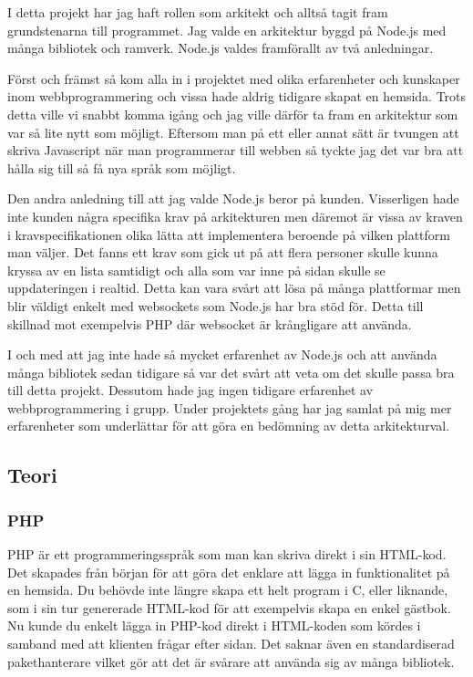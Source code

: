I detta projekt har jag haft rollen som arkitekt och alltså tagit fram grundstenarna till programmet. Jag valde en arkitektur byggd på Node.js med många bibliotek och ramverk. Node.js valdes framförallt av två anledningar. 

Först och främst så kom alla in i projektet med olika erfarenheter och kunskaper inom webbprogrammering och vissa hade aldrig tidigare skapat en hemsida. Trots detta ville vi snabbt komma igång och jag ville därför ta fram en arkitektur som var så lite nytt som möjligt. Eftersom man på ett eller annat sätt är tvungen att skriva Javascript när man programmerar till webben så tyckte jag det var bra att hålla sig till så få nya språk som möjligt.

Den andra anledning till att jag valde Node.js beror på kunden. Visserligen hade inte kunden några specifika krav på arkitekturen men däremot är vissa av kraven i kravspecifikationen olika lätta att implementera beroende på vilken plattform man väljer. Det fanns ett krav som gick ut på att flera personer skulle kunna kryssa av en lista samtidigt och alla som var inne på sidan skulle se uppdateringen i realtid. Detta kan vara svårt att lösa på många plattformar men blir väldigt enkelt med websockets som Node.js har bra stöd för. Detta till skillnad mot exempelvis PHP där websocket är krångligare att använda.

I och med att jag inte hade så mycket erfarenhet av Node.js och att använda många bibliotek sedan tidigare så var det svårt att veta om det skulle passa bra till detta projekt. Dessutom hade jag ingen tidigare erfarenhet av webbprogrammering i grupp. Under projektets gång har jag samlat på mig mer erfarenheter som underlättar för att göra en bedömning av detta arkitekturval.


\subsection{Teori}

\subsubsection{PHP}

PHP är ett programmeringsspråk som man kan skriva direkt i sin HTML-kod. Det skapades från början för att göra det enklare att lägga in funktionalitet på en hemsida. Du behövde inte längre skapa ett helt program i C, eller liknande, som i sin tur genererade HTML-kod för att exempelvis skapa en enkel gästbok. Nu kunde du enkelt lägga in PHP-kod direkt i HTML-koden som kördes i samband med att klienten frågar efter sidan. Det saknar även en standardiserad pakethanterare vilket gör att det är svårare att använda sig av många bibliotek. 

